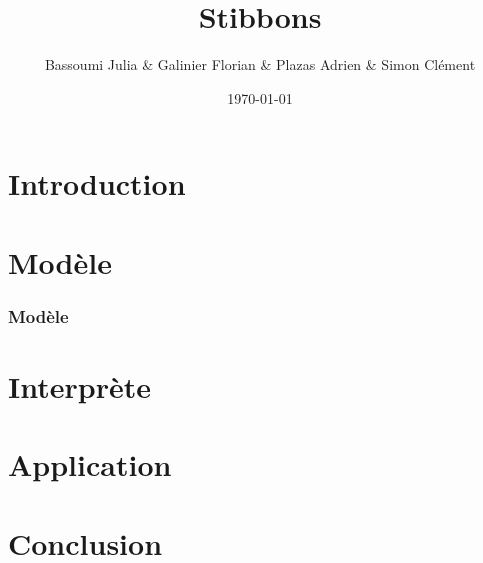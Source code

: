 \documentclass[11pt,handout]{beamer}
\title{Stibbons}
\author{Bassoumi Julia \& Galinier Florian \& Plazas Adrien \& Simon Clément}
\date{\today}
\begin{document}
\begin{frame}
\titlepage
\end{frame}

\begin{frame}
\tableofcontents
\end{frame}

\section{Introduction}
\begin{frame}
\end{frame}

\section{Modèle}
\begin{frame}
\frametitle{Modèle}
\end{frame}

\begin{frame}
\end{frame}


\section{Interprète}
\begin{frame}
\end{frame}

\section{Application}
\begin{frame}
\end{frame}

\section{Conclusion}
\begin{frame}
\end{frame}
\end{document}
